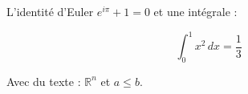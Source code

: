 L'identité d'Euler \(e^{i\pi} + 1 = 0\) et une intégrale :

\[
\int_0^1 x^2 \, dx = \frac{1}{3}
\]

Avec du texte : \(\mathbb{R}^n\) et \(a \leq b\).

